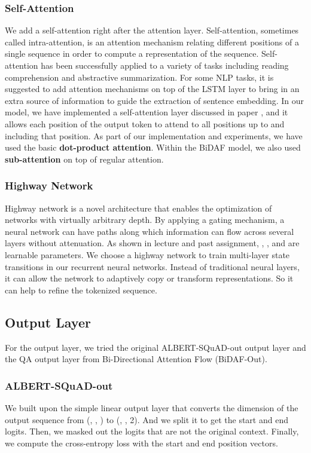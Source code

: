 \documentclass{article}
\begin{document}
\subsubsection{Self-Attention}
We add a self-attention right after the attention layer. Self-attention, sometimes called intra-attention, is an attention mechanism relating different positions of a single sequence in order to compute a representation of the sequence. \citep{attention} Self-attention has been successfully applied to a variety of tasks including reading comprehension and abstractive summarization. For some NLP tasks, it is suggested to add attention mechanisms on top of the LSTM layer to bring in an extra source of information to guide the extraction of sentence embedding. In our model, we have implemented a self-attention layer discussed in paper \citep{attention}, and it allows each position of the output token to attend to all positions up to and including that position. As part of our implementation and experiments, we have used the basic \textbf{dot-product attention}. Within the BiDAF model, we also used \textbf{sub-attention} on top of regular attention.

\subsubsection{Highway Network} \label{highway-network}
Highway network is a novel architecture that enables the optimization of networks with virtually arbitrary depth. By applying a gating mechanism, a neural network can have paths along which information can flow across several layers without attenuation. As shown in lecture and past assignment, , ,  and  are learnable parameters. We choose a highway network to train multi-layer state transitions in our recurrent neural networks. Instead of traditional neural layers, it can allow the network to adaptively copy or transform representations. So it can help to refine the tokenized sequence. \citep{highway} \citep{modules} 



\subsection{Output Layer}
For the output layer, we tried the original ALBERT-SQuAD-out output layer and the QA output layer from Bi-Directional Attention Flow (BiDAF-Out).

\subsubsection{ALBERT-SQuAD-out} \label{albert_squad_out}
We built upon the simple linear output layer that converts the dimension of the output sequence from (, , ) to (, , 2). And we split it to get the start and end logits. Then, we masked out the logits that are not the original context. Finally, we compute the cross-entropy loss with the start and end position vectors.
\end{document}
